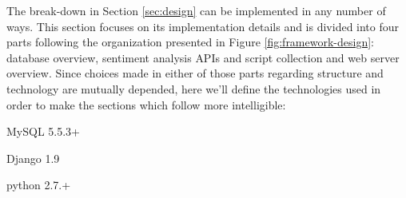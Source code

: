 \newcommand*{\ImplementationPath}{04-framework/02-implementation}

The break-down in Section \ref{sec:design} can be implemented in any number of ways. 
This section focuses on its implementation details and is divided into four parts following the organization presented in Figure \ref{fig:framework-design}: database overview, sentiment analysis APIs and script collection and web server overview. 
Since choices made in either of those parts regarding structure and technology are mutually depended, here we'll define the technologies used in order to make the sections which follow more intelligible:
\begin{description}
\singlespacing
 \item[DBMS:] MySQL 5.5.3+
 \item[Web framework:] Django 1.9 
 \item[Sentiment analysis scripts:] python 2.7.+
\end{description}








\newpage